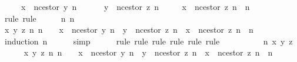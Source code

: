 \begin{isabellebody}
\ \ \ \ {\isasymlongrightarrow}\ x\ {\isacharequal}\ n{\isacharunderscore}cestor\ {\isacharparenleft}y{\isacharcomma}\ n{}{\isacharparenright}\ \isanewline
\ \ \ \ {\isasymlongrightarrow}\ y\ {\isacharequal}\ n{\isacharunderscore}cestor\ {\isacharparenleft}z{\isacharcomma}\ n{}{\isacharparenright}\isanewline
\ \ \ \ {\isasymlongrightarrow}\ x\ {\isacharequal}\ n{\isacharunderscore}cestor\ {\isacharparenleft}z{\isacharcomma}\ n{}\ {\isacharplus}\ n{}{\isacharparenright}{\isachardoublequoteclose}\isanewline
%
\isadelimproof
\ \ %
\endisadelimproof
%
\isatagproof
{}\isamarkupfalse%
\ {\isacharparenleft}rule{\isacharcomma}\ rule{\isacharparenright}\isanewline
{}\isamarkupfalse%
\ {\isacharminus}\isanewline
\ \ \isamarkupfalse%
\ n{}\ n{}\isanewline
\ \ \isamarkupfalse%
\ {\isachardoublequoteopen}{\isasymforall}x\ y\ z{\isachardot}\ {\isacharbraceleft}n{}{\isacharcomma}\ n{}{\isacharbraceright}\ {\isasymsubseteq}\ {\isasymnat}\ {\isasymlongrightarrow}\ x\ {\isacharequal}\ n{\isacharunderscore}cestor\ {\isacharparenleft}y{\isacharcomma}\ n{}{\isacharparenright}\ {\isasymlongrightarrow}\ y\ {\isacharequal}\ n{\isacharunderscore}cestor\ {\isacharparenleft}z{\isacharcomma}\ n{}{\isacharparenright}\ {\isasymlongrightarrow}\ x\ {\isacharequal}\ n{\isacharunderscore}cestor\ {\isacharparenleft}z{\isacharcomma}\ n{}\ {\isacharplus}\ n{}{\isacharparenright}{\isachardoublequoteclose}\isanewline
\ \ \ \ \isamarkupfalse%
\ {\isacharparenleft}induction\ n{}{\isacharparenright}\isanewline
\ \ \ \ \isamarkupfalse%
\ simp\isanewline
\ \ \ \ \isamarkupfalse%
\ {\isacharparenleft}rule{\isacharcomma}\ rule{\isacharcomma}\ rule{\isacharcomma}\ rule{\isacharcomma}\ rule{\isacharcomma}\ rule{\isacharparenright}\isanewline
\ \ \isamarkupfalse%
\ {\isacharminus}\isanewline
\ \ \ \ \isamarkupfalse%
\ n{}\ x\ y\ z\isanewline
\ \ \ \ \isamarkupfalse%
\ {\isachardoublequoteopen}{\isasymforall}x\ y\ z{\isachardot}\ {\isacharbraceleft}n{}{\isacharcomma}\ n{}{\isacharbraceright}\ {\isasymsubseteq}\ {\isasymnat}\ {\isasymlongrightarrow}\ x\ {\isacharequal}\ n{\isacharunderscore}cestor\ {\isacharparenleft}y{\isacharcomma}\ n{}{\isacharparenright}\ {\isasymlongrightarrow}\ y\ {\isacharequal}\ n{\isacharunderscore}cestor\ {\isacharparenleft}z{\isacharcomma}\ n{}{\isacharparenright}\ {\isasymlongrightarrow}\ x\ {\isacharequal}\ n{\isacharunderscore}cestor\ {\isacharparenleft}z{\isacharcomma}\ n{}\ {\isacharplus}\ n{}{\isacharparenright}{\isachardoublequoteclose}\ \isanewline

\end{isabellebody}
